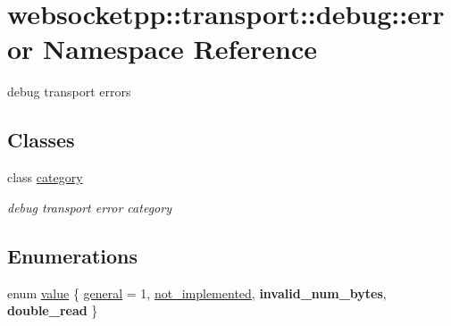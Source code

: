 \hypertarget{namespacewebsocketpp_1_1transport_1_1debug_1_1error}{}\section{websocketpp\+:\+:transport\+:\+:debug\+:\+:error Namespace Reference}
\label{namespacewebsocketpp_1_1transport_1_1debug_1_1error}


debug transport errors  


\subsection*{Classes}
\begin{DoxyCompactItemize}
\item 
class \hyperlink{classwebsocketpp_1_1transport_1_1debug_1_1error_1_1category}{category}
\begin{DoxyCompactList}\small\item\em debug transport error category \end{DoxyCompactList}\end{DoxyCompactItemize}
\subsection*{Enumerations}
\begin{DoxyCompactItemize}
\item 
enum \hyperlink{namespacewebsocketpp_1_1transport_1_1debug_1_1error_a5ee6badaa3c5ebb600c4062394fac69c}{value} \{ \hyperlink{namespacewebsocketpp_1_1transport_1_1debug_1_1error_a5ee6badaa3c5ebb600c4062394fac69cad6cbd99e4f73d21c82b0bb9cf2648028}{general} = 1, 
\hyperlink{namespacewebsocketpp_1_1transport_1_1debug_1_1error_a5ee6badaa3c5ebb600c4062394fac69ca01d1c00e0b91aa7a9146a01ca5f9e709}{not\+\_\+implemented}, 
{\bfseries invalid\+\_\+num\+\_\+bytes}, 
{\bfseries double\+\_\+read}
 \}
\end{DoxyCompactItemize}
